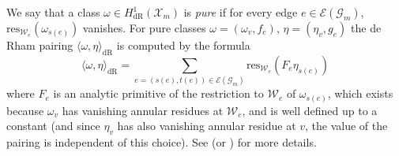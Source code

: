 \documentclass[a4paper,11pt]{amsart}
\numberwithin{equation}{section}
\theoremstyle{plain}
\theoremstyle{definition}
\theoremstyle{remark}
\newcommand{\res}{\mathrm{res}}
\newcommand{\dR}{\mathrm{dR}}
\begin{document}
We say that a class $\omega\in H^1_\mathrm{dR}(\mathscr{X}_m)$ is \emph{pure} if for every edge $e\in\mathcal{E}(\mathcal{G}_m)$, $\res_{\mathcal{W}_e}(\omega_{s(e)})$ vanishes. For pure classes $\omega=(\omega_v,f_e)$, $\eta=(\eta_v,g_e)$ the de Rham pairing $\langle \omega,\eta\rangle_\dR$ is computed by the formula 
\begin{equation}\label{dRpairing}\langle \omega,\eta\rangle_\dR=\sum_{e=(s(e),t(e))\in\mathcal{E}(\mathcal{G}_m)}\mathrm{res}_{\mathcal{W}_{e}}(F_e\eta_{s(e)})\end{equation} where $F_e$ is an analytic primitive of the restriction to $\mathcal{W}_e$ of $\omega_{s(e)}$, which exists because $\omega_v$ has vanishing annular residues at $\mathcal{W}_e$, and is well defined up to a constant (and since $\eta_v$ has also vanishing annular residue at $v$, the value of the pairing is independent of this choice). See \cite[\S3.5]{CI} (or \cite[\S3.1]{DR}) for more details. 
\end{document}
